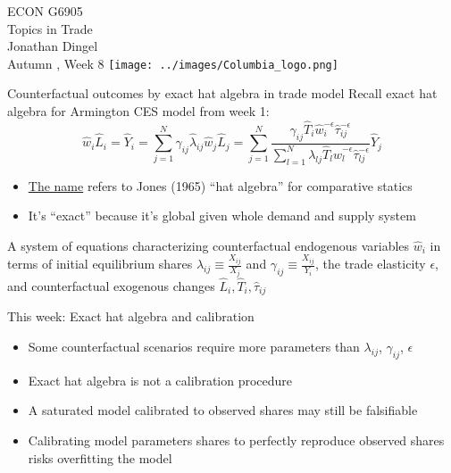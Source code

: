 \documentclass[11pt,notes=hide,aspectratio=169]{beamer}
\begin{document}
\begin{frame}[plain]
\begin{center}
\large
\textcolor{columbiadarkblue}{ECON G6905\\
Topics in Trade\\ 
Jonathan Dingel\\
Autumn \the\year, Week 8}
\vfill 
\texttt{[image: ../images/Columbia\_logo.png]}
\end{center}
\end{frame}
\begin{frame}{Counterfactual outcomes by exact hat algebra in trade model}
Recall exact hat algebra for Armington CES model from week 1:
\begin{equation*}
\hat{w}_i \hat{L}_i
=
\hat{Y}_{i}
=
\sum_{j=1}^{N} \gamma_{ij} \hat{\lambda}_{ij} \hat{w}_{j} \hat{L}_{j}
= 
\sum_{j=1}^{N}
\frac{\gamma_{ij} \hat{T}_{i} \hat{w}_{i}^{-\epsilon}\hat{\tau}_{ij}^{-\epsilon}}
{\sum_{l=1}^{N} \lambda_{lj} \hat{T}_{l} \hat{w}_l^{-\epsilon}\hat{\tau}_{lj}^{-\epsilon}}
\hat{Y}_{j}
\end{equation*}
\vspace{-3mm}
\begin{itemize}
\item \href{https://tradediversion.net/2018/05/07/on-hat-algebra/}{The name} refers to Jones (1965) ``hat algebra'' for comparative statics
\item It's ``exact'' because it's global given whole demand and supply system
\end{itemize}
A system of equations characterizing counterfactual endogenous variables $\hat{w}_i$
in terms of 
initial equilibrium shares $\lambda_{ij} \equiv \frac{X_{ij}}{X_j}$ and $\gamma_{ij} \equiv \frac{X_{ij}}{Y_i}$,
the trade elasticity $\epsilon$,
and
counterfactual exogenous changes $\hat{L}_{i}, \hat{T}_i, \hat{\tau}_{ij}$
\end{frame}
\begin{frame}{This week: Exact hat algebra and calibration}
\begin{itemize}
\item Some counterfactual scenarios require more parameters than $\lambda_{ij}$, $\gamma_{ij}$, $\epsilon$
\item Exact hat algebra is not a calibration procedure
\item A saturated model calibrated to observed shares may still be falsifiable
\item Calibrating model parameters shares to perfectly reproduce observed shares risks overfitting the model
\end{itemize}
\end{frame}
\end{document}
